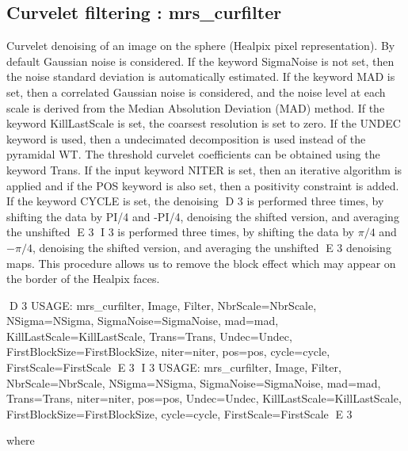 \subsection{Curvelet filtering : mrs\_curfilter}
Curvelet denoising of an image on the sphere (Healpix pixel representation). By default Gaussian noise is considered. 
If the keyword SigmaNoise is not set, then the noise standard deviation is automatically estimated. If the keyword MAD 
is set, then a correlated Gaussian noise is considered, and the noise level at each scale is derived from the Median 
Absolution Deviation (MAD) method. If the keyword KillLastScale is set, the coarsest resolution is set to zero. If the 
UNDEC keyword is used, then a undecimated decomposition is used instead of the pyramidal WT. The threshold curvelet 
coefficients can be obtained using the keyword Trans. If the input keyword NITER is set, then an iterative algorithm is 
applied and if the POS keyword is also set, then a positivity constraint is added. If the keyword CYCLE is set, the denoising 
D 3
is performed three times, by shifting the data by PI/4 and -PI/4, denoising the shifted version, and averaging the unshifted 
E 3
I 3
is performed three times, by shifting the data by $\pi/4$ and $-\pi/4$, denoising the shifted version, and averaging the unshifted 
E 3
denoising maps. This procedure allows us to remove the block effect which may appear on the border of the Healpix faces.
{\bf
\begin{center}
D 3
     USAGE:  mrs\_curfilter, Image, Filter, NbrScale=NbrScale, NSigma=NSigma, SigmaNoise=SigmaNoise, mad=mad, KillLastScale=KillLastScale, 
     						Trans=Trans, Undec=Undec, FirstBlockSize=FirstBlockSize, niter=niter, pos=pos, cycle=cycle, FirstScale=FirstScale   
E 3
I 3
     USAGE: mrs\_curfilter, Image, Filter, NbrScale=NbrScale, NSigma=NSigma, SigmaNoise=SigmaNoise, mad=mad, Trans=Trans, 
     						niter=niter, pos=pos, Undec=Undec, KillLastScale=KillLastScale, FirstBlockSize=FirstBlockSize, 
     						cycle=cycle, FirstScale=FirstScale   
E 3
\end{center}}
where
